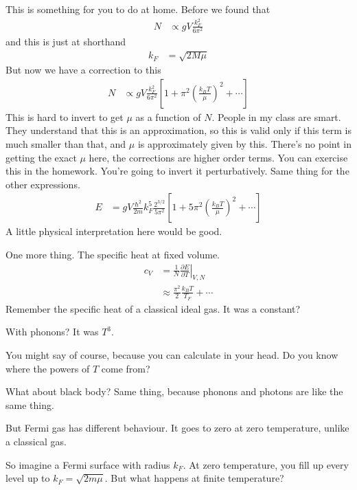 This is something for you to do at home.
Before we found that
\begin{align}
    N &\propto
    g V
    \frac{k_F^2}{6\pi^2}
\end{align}
and this is just at shorthand
\begin{align}
    k_F &= \sqrt{2M \mu}
\end{align}
But now we have a correction to this
\begin{align}
    N &\propto
    g V
    \frac{k_F^2}{6\pi^2}
    \left[ 
    1
    +
    \pi^2
    \left( \frac{k_B T}{\mu} \right)^2
    + \cdots
    \right]
\end{align}
This is hard to invert to get $\mu$ as a function of $N$.
People in my class are smart.
They understand that this is an approximation,
so this is valid only if this term is much smaller than that,
and $\mu$ is approximately given by this.
There's no point in getting the exact $\mu$ here,
the corrections are higher order terms.
You can exercise this in the homework.
You're going to invert it perturbatively.
Same thing for the other expressions.
\begin{align}
    E &=
    gV
    \frac{\hbar^2}{2m}
    k_F^5
    \frac{2^{3/2}}{5\pi^2}
    \left[ 
    1
    +
    5\pi^2
    \left( \frac{k_B T}{\mu} \right)^2
    +
    \cdots
    \right]
\end{align}
A little physical interpretation here would be good.

One more thing.
The specific heat at fixed volume.
\begin{align}
    c_V &=
    \frac{1}{N}
    \left.
    \frac{\partial E}{\partial T}
    \right|_{V,N}\\
    &\approx
    \frac{\pi^2}{2} \frac{k_B T}{T_F}
    + \cdots
\end{align}
Remember the specific heat of a classical ideal gas.
It was a constant?

With phonons?
It was $T^3$.

You might say of course,
because you can calculate in your head.
Do you know where the powers of $T$ come from?

What about black body?
Same thing,
because phonons and photons are like the same thing.

But Fermi gas has different behaviour.
It goes to zero at zero temperature,
unlike a classical gas.

So imagine a Fermi surface with radius $k_F$.
At zero temperature,
you fill up every level up to $k_F = \sqrt{2m\mu}$.
But what happens at finite temperature?

